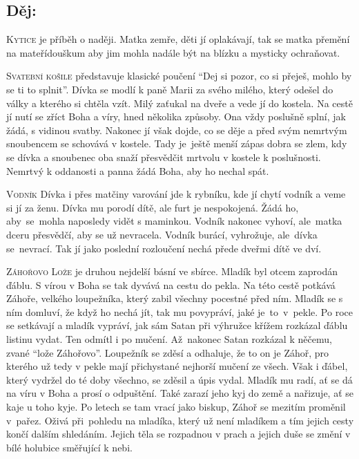 \documentclass[A4paper]{extarticle} %
\begin{document}
\subsection*{Děj:}
{\setlength{\parindent}{5pt}
\textsc{Kytice} je příběh o naději. Matka zemře, děti jí oplakávají, tak se matka přemění na mateřídouškum aby jim mohla nadále být na blízku a mysticky ochraňovat.

\textsc{Svatební košile} představuje klasické poučení \enquote{Dej si pozor, co si přeješ, mohlo by se ti to splnit}. Dívka se modlí k paně Marii za svého milého, který odešel do války a kterého si chtěla vzít. Milý zaťukal na dveře a vede jí do kostela. Na cestě jí nutí se zříct Boha a víry, hned několika způsoby. Ona vždy poslušně splní, jak žádá, s vidinou svatby. Nakonec jí však dojde, co se děje a před svým nemrtvým snoubencem se schovává v kostele. Tady je~ještě menší zápas dobra se zlem, kdy se dívka a snoubenec oba snaží přesvědčit mrtvolu v kostele k poslušnosti. Nemrtvý k oddanosti a panna žádá Boha, aby ho nechal spát.

\textsc{Vodník} Dívka i přes matčiny varování jde k rybníku, kde jí chytí vodník a veme si jí za ženu. Dívka mu porodí dítě, ale furt je nespokojená. Žádá ho, aby~se~mohla naposledy vidět s maminkou. Vodník nakonec vyhoví, ale~matka dceru přesvědčí, aby se už nevracela. Vodník burácí, vyhrožuje, ale~dívka se~nevrací. Tak jí jako poslední rozloučení nechá přede dveřmi dítě ve dví.

\textsc{Záhořovo Lože} je druhou nejdelší básní ve sbírce. Mladík byl otcem zaprodán ďáblu. S vírou v Boha se tak dyvává na cestu do pekla. Na této cestě potkává Záhoře, velkého loupežníka, který zabil všechny pocestné před ním. Mladík se s ním domluví, že když ho nechá jít, tak mu povypráví, jaké je~to~v~pekle. Po roce se setkávají a mladík vypráví, jak sám Satan při výhružce křížem rozkázal ďáblu listinu vydat. Ten odmítl i po mučení. Až~nakonec Satan rozkázal k něčemu, zvané \enquote{lože Záhořovo}. Loupežník se zděsí a odhaluje, že to on je Záhoř, pro kterého už tedy v pekle mají přichystané nejhorší mučení ze všech. Však i ďábel, který vydržel do té doby všechno, se zděsil a úpis vydal. Mladík mu radí, ať se dá na víru v Boha a prosí o odpuštění. Také zarazí jeho kyj do země a nařizuje, ať se kaje u toho kyje. Po letech se tam vrací jako biskup, Záhoř se mezitím proměnil v~pařez. Oživá při~pohledu na mladíka, který už není mladíkem a tím jejich cesty končí dalším shledáním. Jejich těla se rozpadnou v prach a jejich duše se změní v bílé holubice směřující k nebi.
}
\end{document}
